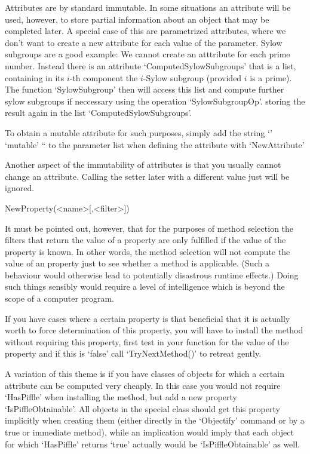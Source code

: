 \danger
Attributes are by standard immutable. In some situations an attribute will
be used, however, to store partial information about an object that may be
completed later. A special case of this are parametrized attributes, where
we don't want to create a new attribute for each value of the parameter.
Sylow subgroups are a good example: We cannot create an atttribute for each
prime number. Instead there is an attribute `ComputedSylowSubgroups' that is
a list, containing in its $i$-th component the $i$-Sylow subgroup (provided
$i$ is a prime). The function `SylowSubgroup' then will access this list and
compute further sylow subgroups if neccessary using the operation
`SylowSubgroupOp'. storing the result again in the list
`ComputedSylowSubgroups'.

\danger
To obtain a mutable attribute for such purposes, simply add the string 
`' `mutable' `` to the parameter list when defining the attribute with
`NewAttribute'

\danger
Another aspect of the immutability of attributes is that you usually cannot
change an attribute. Calling the setter later with a different value just
will be ignored.

\>NewProperty(<name>[,<filter>])


\danger
It must be pointed out, however, that for the purposes of method selection
the filters that return the value of a property are only fulfilled if the
value of the property is known. In other words, the method selection will
not compute the value of an property just to see whether a method is
applicable. (Such a behaviour would otherwise lead to potentially disastrous
runtime effects.) Doing such things sensibly would require a level of
intelligence which is beyond the scope of a computer program. 

\danger
If you have cases where a certain property is that beneficial that
it is actually worth to force determination of this property, you will have
to install the method without requiring this property, first test in your
function for the value of the property and if this is `false' call
`TryNextMethod()' to retreat gently.

\danger
A variation of this theme is if you have classes of objects for which
a certain attribute can be computed very cheaply. In this case you would not
require `HasPiffle' when installing the method, but add a new property
`IsPiffleObtainable'. All objects in the special class should get this
property implicitly when creating them (either directly in the `Objectify'
command or by a true or immediate method), while an implication would imply
that each object for which `HasPiffle' returns `true' actually would be
`IsPiffleObtainable' as well.

